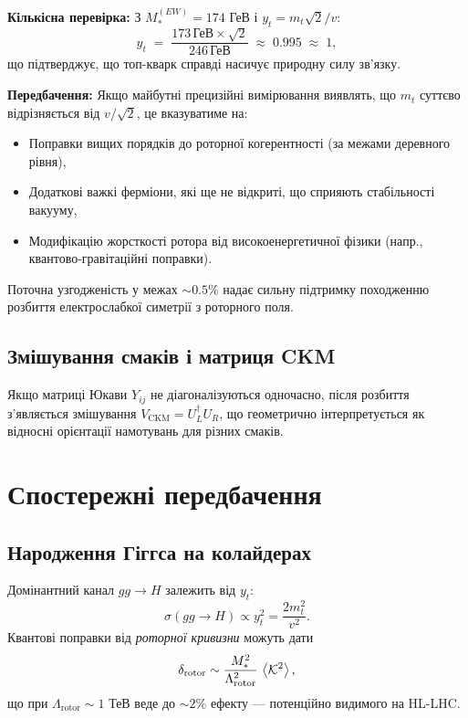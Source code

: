 \documentclass[11pt,a4paper]{article}
\theoremstyle{definition}
\theoremstyle{plain}
\theoremstyle{remark}
\begin{document}
\textbf{Кількісна перевірка:} З $M_*^{(EW)} = 174$ ГеВ і $y_t = m_t\sqrt{2}/v$:
\begin{equation}
y_t \;=\; \frac{173\,\text{ГеВ} \times \sqrt{2}}{246\,\text{ГеВ}} \;\approx\; 0{.}995 \;\approx\; 1,
\end{equation}
що підтверджує, що топ-кварк справді насичує природну силу зв'язку.

\textbf{Передбачення:} Якщо майбутні прецизійні вимірювання виявлять, що $m_t$ суттєво відрізняється від $v/\sqrt{2}$, це вказуватиме на:
\begin{itemize}[leftmargin=*,itemsep=3pt]
  \item Поправки вищих порядків до роторної когерентності (за межами деревного рівня),
  \item Додаткові важкі ферміони, які ще не відкриті, що сприяють стабільності вакууму,
  \item Модифікацію жорсткості ротора від високоенергетичної фізики (напр., квантово-гравітаційні поправки).
\end{itemize}

Поточна узгодженість у межах $\sim 0{.}5\%$ надає сильну підтримку походженню розбиття електрослабкої симетрії з роторного поля.

\subsection{Змішування смаків і матриця CKM}

Якщо матриці Юкави $Y_{ij}$ не діагоналізуються одночасно, після розбиття з’являється змішування $V_{\text{CKM}}=U_L^\dagger U_R$, що геометрично інтерпретується як відносні орієнтації намотувань для різних смаків.

\vspace{1em}

\section{Спостережні передбачення}\label{sec:predictions}

\subsection{Народження Гіггса на колайдерах}

Домінантний канал $gg\to H$ залежить від $y_t$:
\begin{equation}
  \sigma(gg \to H) \propto y_t^2 = \frac{2m_t^2}{v^2}.
\end{equation}
Квантові поправки від \emph{роторної кривизни} можуть дати
\begin{equation}
  \delta_{\text{rotor}} \sim \frac{M_\ast^2}{\Lambda_{\text{rotor}}^2}\,\ev{\mathcal{K}^2},
\end{equation}
що при $\Lambda_{\text{rotor}}\sim 1$ ТеВ веде до $\sim 2\%$ ефекту — потенційно видимого на HL-LHC.
\end{document}
